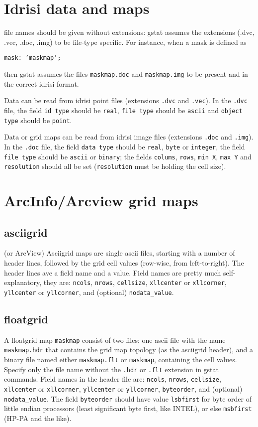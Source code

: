 \documentclass[a4paper,12pt]{book}
\newcommand{\code}[1]{\texttt{#1}}
\begin{document}
\section{Idrisi data and maps}

 file names should be
given without extensions: gstat assumes the extensions (.dvc, .vec, .doc,
.img) to be file-type specific. For instance, when a mask is defined as

\code{mask: 'maskmap';}

\noindent
then gstat assumes the files \code{maskmap.doc} and \code{maskmap.img} to
be present and in the correct idrisi format.

Data can be read from idrisi point files (extensions \code{.dvc} and
\code{.vec}). In the \code{.dvc} file, the field \code{id type} should
be \code{real}, \code{file type} should be \code{ascii} and \code{object
type} should be \code{point}.

Data or grid maps can be read from idrisi image files (extensions
\code{.doc} and \code{.img}). In the \code{.doc} file, the field
\code{data type} should be \code{real}, \code{byte} or \code{integer},
the field \code{file type} should be \code{ascii} or \code{binary};
the fields \code{colums}, \code{rows}, \code{min X}, \code{max Y} and
\code{resolution} should all be set (\code{resolution} must be holding
the cell size).

\section{ArcInfo/Arcview grid maps}
\subsection{asciigrid}

 (or ArcView)
Asciigrid maps are single ascii files, starting with a number
of header lines, followed by the grid cell values (row-wise, from
left-to-right). The header lines ave a field name and a value. Field
names are pretty much self-explanatory, they are:
\code{ncols},
\code{nrows},
\code{cellsize},
\code{xllcenter} or \code{xllcorner},
\code{yllcenter} or \code{yllcorner}, and (optional)
\code{nodata\_value}.

\subsection{floatgrid}
A floatgrid map \code{maskmap} consist of two files: one ascii file with
the name \code{maskmap.hdr} that contains the grid map topology (as the
asciigrid header), and a binary file named either \code{maskmap.flt}
or \code{maskmap}, containing the cell values. Specify only the file name
without the \code{.hdr} or \code{.flt} extension in gstat commands. Field
names in the header file are:
\code{ncols},
\code{nrows},
\code{cellsize},
\code{xllcenter} or \code{xllcorner},
\code{yllcenter} or \code{yllcorner},
\code{byteorder},
and (optional) \code{nodata\_value}.
The field \code{byteorder} should have value \code{lsbfirst} for byte
order of little endian processors (least significant byte first, like
INTEL), or else \code{msbfirst} (HP-PA and the like). 
\end{document}
